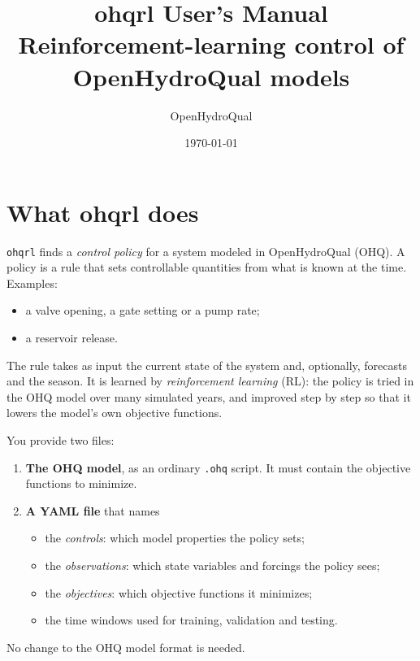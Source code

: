 \documentclass[11pt]{article}
\title{\textbf{ohqrl} User's Manual\\[4pt]
\large Reinforcement-learning control of OpenHydroQual models}
\author{OpenHydroQual}
\date{\today}
\newcommand{\code}[1]{\texttt{#1}}
\begin{document}
\maketitle
\tableofcontents
\newpage

\section{What ohqrl does}

\code{ohqrl} finds a \emph{control policy} for a system modeled in
OpenHydroQual (OHQ). A policy is a rule that sets controllable quantities
from what is known at the time. Examples:
\begin{itemize}[nosep]
\item a valve opening, a gate setting or a pump rate;
\item a reservoir release.
\end{itemize}
The rule takes as input the current state of the system and, optionally,
forecasts and the season. It is learned by \emph{reinforcement learning}
(RL): the policy is tried in the OHQ model over many simulated years, and
improved step by step so that it lowers the model's own objective functions.

You provide two files:
\begin{enumerate}[nosep]
\item \textbf{The OHQ model}, as an ordinary \code{.ohq} script. It must
  contain the objective functions to minimize.
\item \textbf{A YAML file} that names
  \begin{itemize}[nosep]
  \item the \emph{controls}: which model properties the policy sets;
  \item the \emph{observations}: which state variables and forcings the
    policy sees;
  \item the \emph{objectives}: which objective functions it minimizes;
  \item the time windows used for training, validation and testing.
  \end{itemize}
\end{enumerate}
No change to the OHQ model format is needed.
\end{document}
